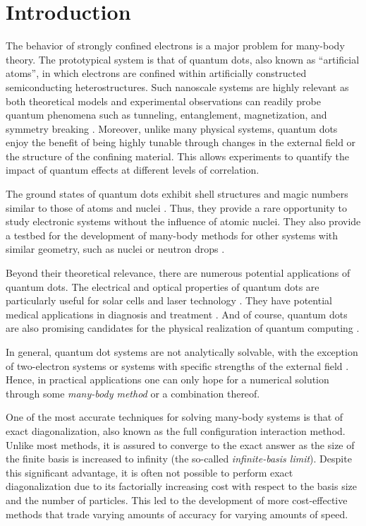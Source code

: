 \documentclass[aip, jcp, 12pt]{revtex4-1}
\begin{document}
\section{Introduction}

The behavior of strongly confined electrons is a major problem for many-body theory.  The prototypical system is that of quantum dots, also known as ``artificial atoms'', in which electrons are confined within artificially constructed semiconducting heterostructures.  Such nanoscale systems are highly relevant as both theoretical models and experimental observations can readily probe quantum phenomena such as tunneling, entanglement, magnetization, and symmetry breaking \cite{reimann2002,engel1993,BIRMAN20131}.  Moreover, unlike many physical systems, quantum dots enjoy the benefit of being highly tunable through changes in the external field or the structure of the confining material.  This allows experiments to quantify the impact of quantum effects at different levels of correlation.

The ground states of quantum dots exhibit shell structures and magic numbers similar to those of atoms and nuclei \cite{tarucha1996}.  Thus, they provide a rare opportunity to study electronic systems without the influence of atomic nuclei.  They also provide a testbed for the development of many-body methods for other systems with similar geometry, such as nuclei or neutron drops \cite{PhysRevC.84.044306}.

Beyond their theoretical relevance, there are numerous potential applications of quantum dots.  The electrical and optical properties of quantum dots are particularly useful for solar cells \cite{jenks:013111,doi:10.1021/cr900289f} and laser technology \cite{strauf2010,5075760}.  They have potential medical applications in diagnosis and treatment \cite{Ben-Ari02042003}.  And of course, quantum dots are also promising candidates for the physical realization of quantum computing \cite{PhysRevA.57.120}.

In general, quantum dot systems are not analytically solvable, with the exception of two-electron systems or systems with specific strengths of the external field \cite{PhysRevA.48.3561,10.1088/0305-4470/27/3/040}.  Hence, in practical applications one can only hope for a numerical solution through some \textit{many-body method} or a combination thereof.

One of the most accurate techniques for solving many-body systems is that of exact diagonalization, also known as the full configuration interaction method.  Unlike most methods, it is assured to converge to the exact answer as the size of the finite basis is increased to infinity (the so-called \textit{infinite-basis limit}).  Despite this significant advantage, it is often not possible to perform exact diagonalization due to its factorially increasing cost with respect to the basis size and the number of particles.  This led to the development of more cost-effective methods that trade varying amounts of accuracy for varying amounts of speed.
\end{document}

